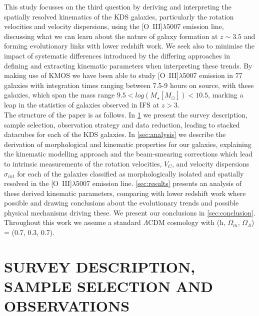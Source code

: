 \documentclass[fleqn,usenatbib]{mn2e}
\begin{document}
This study focusses on the third question by deriving and interpreting the spatially resolved kinematics of the KDS galaxies, particularly the rotation velocities and velocity dispersions, using the [O~{\sc III}]$\lambda$5007 emission line, discussing what we can learn about the nature of galaxy formation at $z \sim 3.5$ and forming evolutionary links with lower redshift work.
We seek also to minimise the impact of systematic differences introduced by the differing approaches in defining and extracting kinematic parameters when interpreting these trends.  
By making use of KMOS we have been able to study [O~{\sc III}]$\lambda$5007 emission in 77 galaxies with integration times ranging between 7.5-9 hours on source, with these galaxies, which span the mass range $9.5 < log(M_{\star}[M_{\odot}]) < 10.5$, marking a leap in the statistics of galaxies observed in IFS at $z > 3$. \\

The structure of the paper is as follows. In \cref{sec:Survey_and_data} we present the survey description, sample selection, observation strategy and data reduction, leading to stacked datacubes for each of the KDS galaxies.
In \cref{sec:analysis} we describe the derivation of morphological and kinematic properties for our galaxies, explaining the kinematic modelling approach and the beam-smearing corrections which lead to intrinsic measurements of the rotation velocities, $V_{C}$, and velocity dispersions $\sigma_{int}$ for each of the galaxies classified as morphologically isolated and spatially resolved in the [O~{\sc III}]$\lambda$5007 emission line.
\cref{sec:results} presents an analysis of these derived kinematic parameters, comparing with lower redshift work where possible and drawing conclusions about the evolutionary trends and possible physical mechanisms driving these.
We present our conclusions in \cref{sec:conclusion}.
Throughout this work we assume a standard $\Lambda$CDM cosmology with (h, $\Omega_{m}$, $\Omega_{\Lambda}$) = (0.7, 0.3, 0.7). 

\section{SURVEY DESCRIPTION, SAMPLE SELECTION AND OBSERVATIONS}\label{sec:Survey_and_data}
\end{document}
